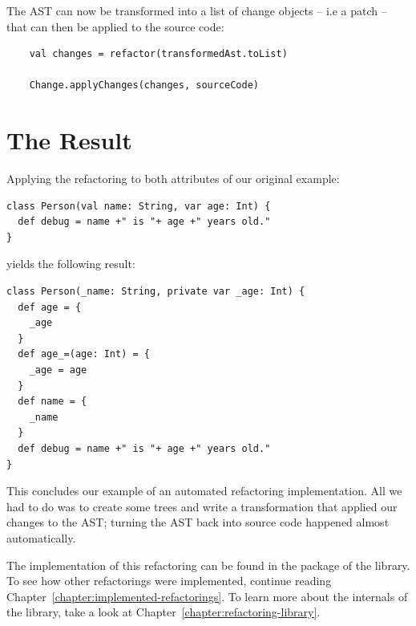 \documentclass[10pt,a4paper,oneside]{scrreprt}
\begin{document}
The AST can now be transformed into a list of change objects -- i.e a patch -- that can then be applied to the source code:

\begin{lstlisting}
    val changes = refactor(transformedAst.toList)
    
    Change.applyChanges(changes, sourceCode)
\end{lstlisting}

\section{The Result}

Applying the refactoring to both attributes of our original example:

\begin{lstlisting}
class Person(val name: String, var age: Int) {
  def debug = name +" is "+ age +" years old."
}
\end{lstlisting}

yields the following result:

\begin{lstlisting}
class Person(_name: String, private var _age: Int) {
  def age = {
    _age
  }
  def age_=(age: Int) = {
    _age = age
  }
  def name = {
    _name
  }
  def debug = name +" is "+ age +" years old."
}
\end{lstlisting}

This concludes our example of an automated refactoring implementation. All we had to do was to create some trees and write a transformation that applied our changes to the AST; turning the AST back into source code happened almost automatically.

The implementation of this refactoring can be found in the  package of the library. To see how other refactorings were implemented, continue reading Chapter~\vref{chapter:implemented-refactorings}. To learn more about the internals of the library, take a look at Chapter~\vref{chapter:refactoring-library}.





\clearpage
\bib
\end{document}

